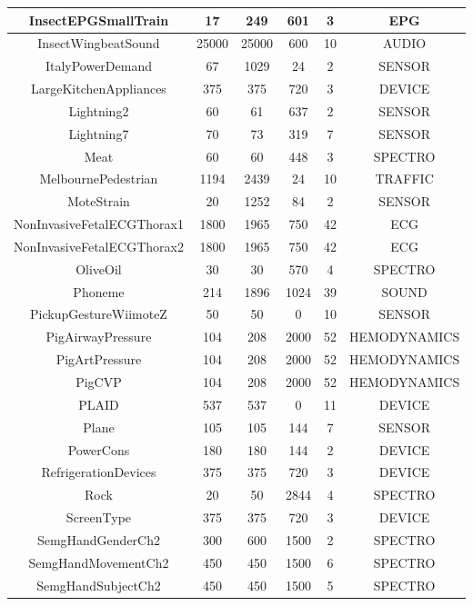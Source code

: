\begin{table}
\begin{center}
\begin{longtable}{||c|c|c|c|c|c||}
 \hline
 InsectEPGSmallTrain & 17 & 249 & 601 & 3 & EPG \\[1ex]
 \hline
 InsectWingbeatSound & 25000 & 25000 & 600 & 10 & AUDIO \\[1ex]
 \hline
 ItalyPowerDemand & 67 & 1029 & 24 & 2 & SENSOR \\[1ex]
 \hline
 LargeKitchenAppliances & 375 & 375 & 720 & 3 & DEVICE \\[1ex]
 \hline
 Lightning2 & 60 & 61 & 637 & 2 & SENSOR \\[1ex]
 \hline
 Lightning7 & 70 & 73 & 319 & 7 & SENSOR \\[1ex]
 \hline
 Meat & 60 & 60 & 448 & 3 & SPECTRO \\[1ex]
 \hline
 MelbournePedestrian & 1194 & 2439 & 24 & 10 & TRAFFIC \\[1ex]
 \hline
 MoteStrain & 20 & 1252 & 84 & 2 & SENSOR \\[1ex]
 \hline
 NonInvasiveFetalECGThorax1 & 1800 & 1965 & 750 & 42 & ECG \\[1ex]
 \hline
 NonInvasiveFetalECGThorax2 & 1800 & 1965 & 750 & 42 & ECG \\[1ex]
 \hline
 OliveOil & 30 & 30 & 570 & 4 & SPECTRO \\[1ex]
 \hline
 Phoneme & 214 & 1896 & 1024 & 39 & SOUND \\[1ex]
 \hline
 PickupGestureWiimoteZ & 50 & 50 & 0 & 10 & SENSOR \\[1ex]
 \hline
 PigAirwayPressure & 104 & 208 & 2000 & 52 & HEMODYNAMICS \\[1ex]
 \hline
 PigArtPressure & 104 & 208 & 2000 & 52 & HEMODYNAMICS \\[1ex]
 \hline
 PigCVP & 104 & 208 & 2000 & 52 & HEMODYNAMICS \\[1ex]
 \hline
 PLAID & 537 & 537 & 0 & 11 & DEVICE \\[1ex]
 \hline
 Plane & 105 & 105 & 144 & 7 & SENSOR \\[1ex]
 \hline
 PowerCons & 180 & 180 & 144 & 2 & DEVICE \\[1ex]
 \hline
 RefrigerationDevices & 375 & 375 & 720 & 3 & DEVICE \\[1ex]
 \hline
 Rock & 20 & 50 & 2844 & 4 & SPECTRO \\[1ex]
 \hline
 ScreenType & 375 & 375 & 720 & 3 & DEVICE \\[1ex]
 \hline
 SemgHandGenderCh2 & 300 & 600 & 1500 & 2 & SPECTRO \\[1ex]
 \hline
 SemgHandMovementCh2 & 450 & 450 & 1500 & 6 & SPECTRO \\[1ex]
 \hline
 SemgHandSubjectCh2 & 450 & 450 & 1500 & 5 & SPECTRO \\[1ex]

\end{longtable}
\end{center}
\end{table}

